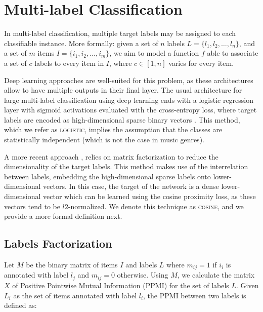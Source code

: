 \documentclass{article}
\begin{document}
\section{Multi-label Classification}\label{sec:multilabel}



In multi-label classification, multiple target labels may be assigned to each classifiable instance. More formally: given a set of $n$ labels $L = \{l_1,l_2,\ldots,l_n\}$, and a set of $m$ items $I = \{i_1,i_2,\ldots,i_m\}$, we aim to model a function $f$ able to associate a set of $c$ labels to every item in $I$, where $c \in [1, n]$ varies for every item. 

Deep learning approaches are well-suited for this problem, as these architectures allow to have multiple outputs in their final layer.
The usual architecture for large multi-label classification using deep learning ends with a logistic regression layer with sigmoid activations evaluated with the cross-entropy loss, where target labels are encoded as high-dimensional sparse binary vectors \cite{szegedy2016rethinking}. 
This method, which we refer as \textsc{logistic}, implies the assumption that the classes are statistically independent (which is not the case in music genres).


A more recent approach \cite{Chollet2016}, relies on matrix factorization to reduce the dimensionality of the target labels. 
This method makes use of the interrelation between labels, embedding the high-dimensional sparse labels onto lower-dimensional vectors.
In this case, the target of the network is a dense lower-dimensional vector which can be learned using the cosine proximity loss, as these vectors tend to be $l2$-normalized. 
We denote this technique as \textsc{cosine}, and we provide a more formal definition next.

\subsection{Labels Factorization}\label{sec:factorization}






Let $M$ be the binary matrix of items $I$ and labels $L$ where $m_{ij} = 1$ if $i_i$ is annotated with label $l_j$ and $m_{ij} = 0$ otherwise. Using $M$, we calculate the matrix $X$ of Positive Pointwise Mutual Information (PPMI) for the set of labels $L$. Given $L_i$ as the set of items annotated with label $l_i$, the PPMI between two labels is defined as:
\end{document}
